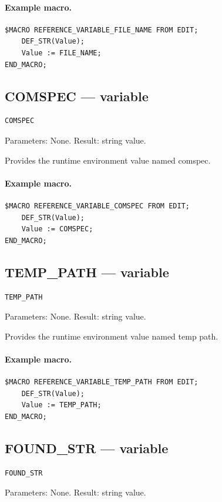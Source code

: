 \documentclass[a4paper,10pt,twoside,openany]{book}
\begin{document}
\paragraph{Example macro.}
\begin{verbatim}
$MACRO REFERENCE_VARIABLE_FILE_NAME FROM EDIT;
    DEF_STR(Value);
    Value := FILE_NAME;
END_MACRO;
\end{verbatim}

\label{prim:variable-comspec}
\subsection*{COMSPEC --- variable}
\begin{verbatim}
COMSPEC
\end{verbatim}
Parameters: None. Result: string value.

Provides the runtime environment value named comspec.

\paragraph{Example macro.}
\begin{verbatim}
$MACRO REFERENCE_VARIABLE_COMSPEC FROM EDIT;
    DEF_STR(Value);
    Value := COMSPEC;
END_MACRO;
\end{verbatim}

\label{prim:variable-temp-path}
\subsection*{TEMP\_PATH --- variable}
\begin{verbatim}
TEMP_PATH
\end{verbatim}
Parameters: None. Result: string value.

Provides the runtime environment value named temp path.

\paragraph{Example macro.}
\begin{verbatim}
$MACRO REFERENCE_VARIABLE_TEMP_PATH FROM EDIT;
    DEF_STR(Value);
    Value := TEMP_PATH;
END_MACRO;
\end{verbatim}

\label{prim:variable-found-str}
\subsection*{FOUND\_STR --- variable}
\begin{verbatim}
FOUND_STR
\end{verbatim}
Parameters: None. Result: string value.
\end{document}

